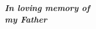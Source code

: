 \newpage
\pagestyle{empty}
\null\vfill\vfill\vfill
\begin{center}
    \textit{\textbf{\Large In loving memory of}}\\
    \vskip 0.2in
    \textit{\textbf{\Large my Father}}
\end{center}
    
\vfill\vfill\vfill\vfill\vfill\vfill\null
\clearpage  %
\clearpage\null\newpage
